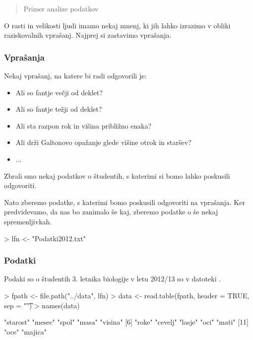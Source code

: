  {\maketitle}
 {\frame{\titlepage}}
\tableofcontents
\begin{abstract}
 Primer analize podatkov
\end{abstract}
O rasti in velikosti ljudi imamo nekaj mnenj, ki jih lahko izrazimo v obliki raziskovalnih vprašanj. Najprej si zastavimo vprašanja.
\begin{frame}[fragile]
\frametitle{Vprašanja}
Nekaj vprašanj, na katere bi radi odgovorili je:
\begin{itemize}
  \item Ali so fantje večji od deklet?
  \item Ali so fantje težji od deklet?
  \item Ali sta razpon rok in višina približno enaka?
  \item Ali drži Galtonovo opažanje glede višine otrok in staršev?
  \item ...
\end{itemize}
Zbrali smo nekaj podatkov o študentih, s katerimi si bomo lahko poskusili odgovoriti.
\end{frame}
Nato zberemo podatke, s katerimi bomo poskusili odgovoriti na vprašanja. Ker predvidevamo, da nas bo zanimalo še kaj, zberemo podatke o še nekaj spremenljivkah.
\begin{Schunk}
\begin{Sinput}
> lfn <- "Podatki2012.txt"
\end{Sinput}
\end{Schunk}

\begin{frame}[fragile]
\frametitle{Podatki}
Podaki so o študentih 3. letnika biologije v letu 2012/13 so v datoteki .
\begin{Schunk}
\begin{Sinput}
> fpath <- file.path("../data", lfn)
> data <- read.table(fpath, header = TRUE, sep = "\t")
> names(data)
\end{Sinput}
\begin{Soutput}
 [1] "starost" "mesec"   "spol"    "masa"    "visina" 
 [6] "roke"    "cevelj"  "lasje"   "oci"     "mati"   
[11] "oce"     "majica" 
\end{Soutput}
\end{Schunk}
\end{frame}

